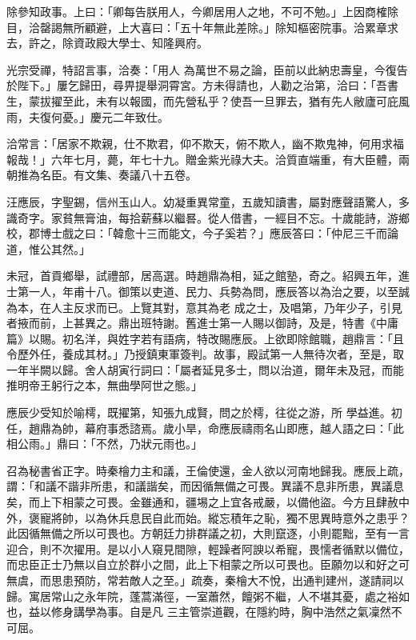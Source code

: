 \begin{pinyinscope}
 除參知政事。上曰：「卿每告朕用人，今卿居用人之地，不可不勉。」上因商榷除目，洽罄謁無所顧避，上大喜曰：「五十年無此差除。」除知樞密院事。洽累章求去，許之，除資政殿大學士、知隆興府。



 光宗受禪，特詔言事，洽奏：「用人
 為萬世不易之論，臣前以此納忠壽皇，今復告於陛下。」屢乞歸田，尋畀提舉洞霄宮。方未得請也，人勸之治第，洽曰：「吾書生，蒙拔擢至此，未有以報國，而先營私乎？使吾一旦罪去，猶有先人敝廬可庇風雨，夫復何憂。」慶元二年致仕。



 洽常言：「居家不欺親，仕不欺君，仰不欺天，俯不欺人，幽不欺鬼神，何用求福報哉！」六年七月，薨，年七十九。贈金紫光祿大夫。洽質直端重，有大臣體，兩朝推為名臣。有文集、奏議八十五卷。



 汪應辰，字聖錫，信州玉山人。幼凝重異常童，五歲知讀書，屬對應聲語驚人，多識奇字。家貧無膏油，每拾薪蘇以繼晷。從人借書，一經目不忘。十歲能詩，游鄉校，郡博士戲之曰：「韓愈十三而能文，今子奚若？」應辰答曰：「仲尼三千而論道，惟公其然。」



 未冠，首貢鄉舉，試禮部，居高選。時趙鼎為相，延之館塾，奇之。紹興五年，進士第一人，年甫十八。御策以吏道、民力、兵勢為問，應辰答以為治之要，以至誠為本，在人主反求而已。上覽其對，意其為老
 成之士，及唱第，乃年少子，引見者掖而前，上甚異之。鼎出班特謝。舊進士第一人賜以御詩，及是，特書《中庸篇》以賜。初名洋，與姓字若有語病，特改賜應辰。上欲即除館職，趙鼎言：「且令歷外任，養成其材。」乃授鎮東軍簽判。故事，殿試第一人無待次者，至是，取一年半闕以歸。舍人胡寅行詞曰：「屬者延見多士，問以治道，爾年未及冠，而能推明帝王躬行之本，無曲學阿世之態。」



 應辰少受知於喻樗，既擢第，知張九成賢，問之於樗，往從之游，所
 學益進。初任，趙鼎為帥，幕府事悉諮焉。歲小旱，命應辰禱雨名山即應，越人語之曰：「此相公雨。」鼎曰：「不然，乃狀元雨也。」



 召為秘書省正字。時秦檜力主和議，王倫使還，金人欲以河南地歸我。應辰上疏，謂：「和議不諧非所患，和議諧矣，而因循無備之可畏。異議不息非所患，異議息矣，而上下相蒙之可畏。金雖通和，疆埸之上宜各戒嚴，以備他盜。今方且肆赦中外，褒寵將帥，以為休兵息民自此而始。縱忘積年之恥，獨不思異時意外之患乎？
 此因循無備之所以可畏也。方朝廷力排群議之初，大則竄逐，小則罷黜，至有一言迎合，則不次擢用。是以小人窺見間隙，輕躁者阿諛以希寵，畏懦者循默以備位，而忠臣正士乃無以自立於群小之間，此上下相蒙之所以可畏也。臣願勿以和好之可無虞，而思患預防，常若敵人之至。」疏奏，秦檜大不悅，出通判建州，遂請祠以歸。寓居常山之永年院，蓬蒿滿徑，一室蕭然，饘粥不繼，人不堪其憂，處之裕如也，益以修身講學為事。自是凡
 三主管崇道觀，在隱約時，胸中浩然之氣凜然不可屈。




\end{pinyinscope}
